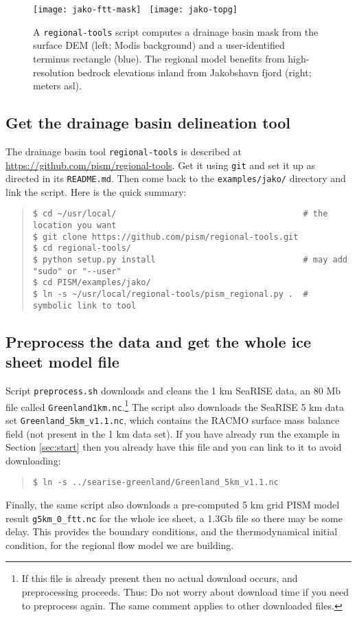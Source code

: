\begin{figure}[ht]
  \centering
  \texttt{[image: jako-ftt-mask]} \, \texttt{[image: jako-topg]}
  \caption{A \texttt{regional-tools} script computes a drainage basin mask from the surface DEM (left; Modis background) and a user-identified terminus rectangle (blue).  The regional model benefits from high-resolution bedrock elevations inland from Jakobshavn fjord (right; meters asl).}
  \label{fig:jako-basin-topg}
\end{figure}


\subsection*{Get the drainage basin delineation tool}
The drainage basin tool \texttt{regional-tools} is described at \url{https://github.com/pism/regional-tools}.  Get it using \texttt{git} and set it up as directed in its \texttt{README.md}.  Then come back to the \texttt{examples/jako/} directory and link the script.  Here is the quick summary:
\begin{quote}\small
\begin{verbatim}
$ cd ~/usr/local/                                      # the location you want
$ git clone https://github.com/pism/regional-tools.git
$ cd regional-tools/
$ python setup.py install                              # may add "sudo" or "--user"
$ cd PISM/examples/jako/
$ ln -s ~/usr/local/regional-tools/pism_regional.py .  # symbolic link to tool
\end{verbatim}
\normalsize\end{quote}

\subsection*{Preprocess the data and get the whole ice sheet model file}
Script \texttt{preprocess.sh} downloads and cleans the 1 km SeaRISE data, an 80 Mb file called \texttt{Greenland1km.nc}.\footnote{If this file is already present then no actual download occurs, and preprocessing proceeds.  Thus:  Do not worry about download time if you need to preprocess again.  The same comment applies to other downloaded files.}  The script also downloads the SeaRISE 5 km data set \texttt{Greenland_5km_v1.1.nc}, which contains the RACMO surface mass balance field (not present in the 1 km data set).  If you have already run the example in Section \ref{sec:start} then you already have this file and you can link to it to avoid downloading:
\begin{quote}\small
\begin{verbatim}
$ ln -s ../searise-greenland/Greenland_5km_v1.1.nc
\end{verbatim}
\normalsize\end{quote}
Finally, the same script also downloads a pre-computed 5 km grid PISM model result \texttt{g5km_0_ftt.nc} for the whole ice sheet, a 1.3Gb file so there may be some delay.  This provides the boundary conditions, and the thermodynamical initial condition, for the regional flow model we are building.

